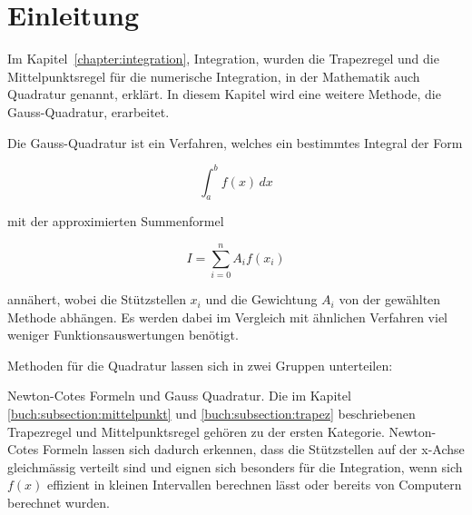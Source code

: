 %
%
%
\section{Einleitung\label{quadratur:section:einleitung}}

Im Kapitel~\ref{chapter:integration}, Integration, wurden die 
Trapezregel und die Mittelpunktsregel für die numerische Integration, 
in der Mathematik auch Quadratur genannt, erklärt. 
In diesem Kapitel wird eine weitere Methode, die Gauss-Quadratur, erarbeitet.

Die Gauss-Quadratur ist ein Verfahren, welches ein bestimmtes Integral der Form

\begin{equation}
    \int_{a}^{b} f(x) \,dx
\end{equation}

mit der approximierten Summenformel

\begin{equation}
    I = \sum_{i=0}^{n} A_i f(x_i)
\end{equation}

annähert, wobei die Stützstellen $x_i$ und die Gewichtung $A_i$ von der gewählten 
Methode abhängen. 
Es werden dabei im Vergleich mit ähnlichen Verfahren viel weniger Funktionsauswertungen benötigt.


Methoden für die Quadratur lassen sich in zwei Gruppen unterteilen: 

Newton-Cotes Formeln und Gauss Quadratur.
Die im Kapitel \ref{buch:subsection:mittelpunkt} und \ref{buch:subsection:trapez} beschriebenen
Trapezregel und Mittelpunktsregel gehören zu der ersten Kategorie.
Newton-Cotes Formeln lassen sich dadurch erkennen, dass die Stützstellen auf der x-Achse 
gleichmässig verteilt sind und eignen sich besonders für die Integration, wenn sich $f(x)$ 
effizient in kleinen Intervallen berechnen lässt oder bereits von Computern berechnet wurden.







